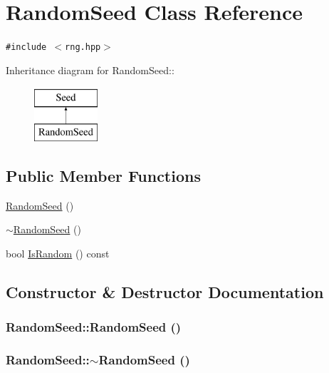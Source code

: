 \hypertarget{classRandomSeed}{
\section{RandomSeed Class Reference}
\label{classRandomSeed}
}
{\tt \#include $<$rng.hpp$>$}

Inheritance diagram for RandomSeed::\begin{figure}[H]
\begin{center}
\leavevmode
\includegraphics[height=2cm]{classRandomSeed}
\end{center}
\end{figure}
\subsection*{Public Member Functions}
\begin{CompactItemize}
\item 
\hyperlink{classRandomSeed_4da7f80d3f9ecb8a005366a19e30e969}{RandomSeed} ()
\item 
\hyperlink{classRandomSeed_459ac1697155ede25fab222ef7440df4}{$\sim$RandomSeed} ()
\item 
bool \hyperlink{classRandomSeed_fbd454a2e8bc5eda68d9b10e9cb1705c}{IsRandom} () const 
\end{CompactItemize}


\subsection{Constructor \& Destructor Documentation}
\hypertarget{classRandomSeed_4da7f80d3f9ecb8a005366a19e30e969}{
\subsubsection[{RandomSeed}]{\setlength{\rightskip}{0pt plus 5cm}RandomSeed::RandomSeed ()}}
\label{classRandomSeed_4da7f80d3f9ecb8a005366a19e30e969}


\hypertarget{classRandomSeed_459ac1697155ede25fab222ef7440df4}{
\subsubsection[{$\sim$RandomSeed}]{\setlength{\rightskip}{0pt plus 5cm}RandomSeed::$\sim$RandomSeed ()}}
\label{classRandomSeed_459ac1697155ede25fab222ef7440df4}




